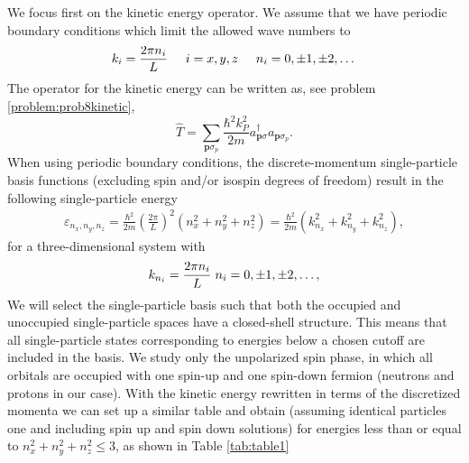 We focus first on the kinetic energy operator.  We assume that we have
periodic boundary conditions which limit the allowed wave numbers to
\[
k_i=\frac{2\pi n_i}{L}\hspace{0.5cm} i=x,y,z \hspace{0.5cm} n_i=0,\pm
1,\pm 2, \dots
\]
The operator for the kinetic energy can be written as, see problem
\ref{problem:prob8kinetic},
\[
\hat{T}=\sum_{\mathbf{p}\sigma_p}\frac{\hbar^2k_P^2}{2m}a_{\mathbf{p}\sigma}^{\dagger}a_{\mathbf{p}\sigma_p}.
\]
When using periodic boundary conditions, the discrete-momentum
single-particle basis functions (excluding spin and/or isospin degrees
of freedom) result in the following single-particle energy
\begin{align}
  \varepsilon_{n_{x}, n_{y}, n_{z}} = \frac{\hbar^{2}}{2m} \left(
  \frac{2\pi }{L}\right)^{2} \left( n_{x}^{2} + n_{y}^{2} +
  n_{z}^{2}\right)=\frac{\hbar^2}{2m}\left(k_{n_x}^2+k_{n_y}^2+k_{n_z}^2\right),
\end{align} 
for a three-dimensional system with
\[
k_{n_i}=\frac{2\pi n_i}{L} \hspace{0.1cm} n_i = 0, \pm 1, \pm 2,
\dots,
\]
We will select the single-particle basis such that both the occupied
and unoccupied single-particle spaces have a closed-shell
structure. This means that all single-particle states corresponding to
energies below a chosen cutoff are included in the basis. We study
only the unpolarized spin phase, in which all orbitals are occupied
with one spin-up and one spin-down fermion (neutrons and protons in
our case).  With the kinetic energy rewritten in terms of the
discretized momenta we can set up a similar table and obtain (assuming
identical particles one and including spin up and spin down solutions)
for energies less than or equal to $n_{x}^{2}+n_{y}^{2}+n_{z}^{2}\le
3$, as shown in Table \ref{tab:table1}
